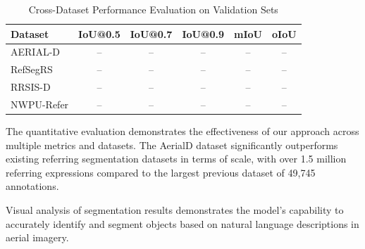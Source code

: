 \begin{table}[H]
\centering
\caption{Cross-Dataset Performance Evaluation on Validation Sets}
\label{tab:cross_dataset_results}
\begin{tabular}{@{}lccccc@{}}
\toprule
\textbf{Dataset} & \textbf{IoU@0.5} & \textbf{IoU@0.7} & \textbf{IoU@0.9} & \textbf{mIoU} & \textbf{oIoU} \\
\midrule
AERIAL-D & -- & -- & -- & -- & -- \\
RefSegRS & -- & -- & -- & -- & -- \\
RRSIS-D & -- & -- & -- & -- & -- \\
NWPU-Refer & -- & -- & -- & -- & -- \\
\bottomrule
\end{tabular}
\end{table}

\begin{table}[H]
\centering
\caption{Comparison with Existing RRSIS Datasets}
\label{tab:dataset_comparison}
\end{table}

The quantitative evaluation demonstrates the effectiveness of our approach across multiple metrics and datasets. The AerialD dataset significantly outperforms existing referring segmentation datasets in terms of scale, with over 1.5 million referring expressions compared to the largest previous dataset of 49,745 annotations.

Visual analysis of segmentation results demonstrates the model's capability to accurately identify and segment objects based on natural language descriptions in aerial imagery.

